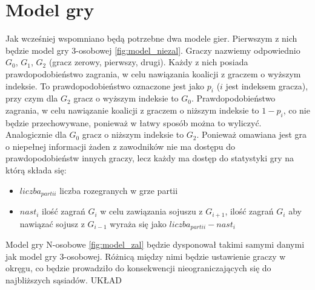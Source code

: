 \section{Model gry}
\label{sec:model}
Jak wcześniej wspomniano będą potrzebne dwa modele gier. Pierwszym z nich będzie model gry 3-osobowej \ref{fig:model_niezal}. Graczy nazwiemy odpowiednio $G_0$, $G_1$, $G_2$ (gracz zerowy, pierwszy, drugi). Każdy z nich posiada prawdopodobieństwo zagrania, w celu nawiązania koalicji z graczem o wyższym indeksie. To prawdopodobieństwo oznaczone jest jako $p_i$ ($i$ jest indeksem gracza), przy czym dla $G_2$ gracz o wyższym indeksie to $G_0$. Prawdopodobieństwo zagrania, w celu nawiązanie koalicji z graczem o niższym indeksie to $1 - p_i$, co nie będzie przechowywane, ponieważ w łatwy sposób można to wyliczyć. Analogicznie dla $G_0$ gracz o niższym indeksie to $G_2$. Ponieważ omawiana jest gra o niepełnej informacji żaden z zawodników nie ma dostępu do prawdopodobieństw innych graczy, lecz każdy ma dostęp do statystyki gry na którą składa się:
\begin{itemize}
\item $liczba_{partii}$ liczba rozegranych w grze partii
\item $nast_i$ ilość zagrań $G_i$ w celu zawiązania sojuszu z $G_{i+1}$, ilość zagrań $G_{i}$ aby nawiązać sojusz z $G_{i-1}$ wyraża się jako $liczba_{partii} - nast_i$
\end{itemize}
Model gry N-osobowe \ref{fig:model_zal} będzie dysponował takimi samymi danymi jak model gry 3-osobowej. Różnicą między nimi będzie ustawienie graczy w okręgu, co będzie prowadziło do konsekwencji nieograniczających się do najbliższych sąsiadów.
{\color{red} UKŁAD}
